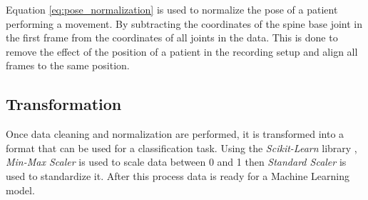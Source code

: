         Equation \ref{eq:pose_normalization} is used to normalize the pose of a patient performing a movement. By subtracting the coordinates of the spine base joint in the first frame from the coordinates of all joints in the data. This is done to remove the effect of the position of a patient in the recording setup and align all frames to the same position. 

        \subsection{Transformation}

        Once data cleaning and normalization are performed, it is transformed into a format that can be used for a classification task. Using the \textit{Scikit-Learn} library \cite{sklearn_api}, \textit{Min-Max Scaler} is used to scale data between 0 and 1 then \textit{Standard Scaler} is used to standardize it. After this process data is ready for a Machine Learning model.

\cleardoublepage
